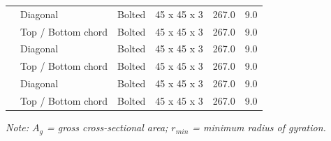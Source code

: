 \documentclass[12pt,a4paper]{report}
\numberwithin{table}{chapter}
\numberwithin{figure}{chapter}
\begin{document}
\begin{longtable}{|C{2.0cm}|L{2.0cm}|L{2.2cm}|C{2.5cm}|C{2.0cm}|C{2.0cm}|}
\hline
{} & Diagonal & Bolted & 45 x 45 x 3 & 267.0 & 9.0 \\[6pt]
 & Top / Bottom chord & Bolted & 45 x 45 x 3 & 267.0 & 9.0 \\[6pt]
\hline
{} & Diagonal & Bolted & 45 x 45 x 3 & 267.0 & 9.0 \\[6pt]
 & Top / Bottom chord & Bolted & 45 x 45 x 3 & 267.0 & 9.0 \\[6pt]
\hline
{} & Diagonal & Bolted & 45 x 45 x 3 & 267.0 & 9.0 \\[6pt]
 & Top / Bottom chord & Bolted & 45 x 45 x 3 & 267.0 & 9.0 \\[6pt]
\hline
\end{longtable}
\noindent\textit{Note: $A_g$ = gross cross-sectional area; $r_{min}$ = minimum radius of gyration.}
\end{document}
